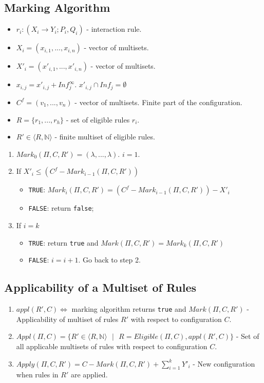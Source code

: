 \documentclass{article}
\newcommand{\s}{\text{ }}
\begin{document}
\subsection{Marking Algorithm}

\begin{itemize}
   \item $r_i: (X_i \rightarrow Y_i; P_i, Q_i)$ - interaction rule.
   \item $X_i = (x_{i,1},...,x_{i,n})$ - vector of multisets.
   \item $X'_i = (x'_{i,1},...,x'_{i,n})$ - vector of multisets.
   \item $x_{i,j} = x'_{i,j} + Inf_{j}^{\infty}$. $x'_{i,j} \cap Inf_j = \emptyset$
   \item $C^f = (v_1,...,v_n)$ - vector of multisets. Finite part of the configuration.
   \item $R = \{r_1,...,r_h\}$ - set of eligible rules $r_i$.
   \item $R' \in \langle R, \mathbb{N} \rangle$ - finite multiset of eligible rules.
\end{itemize}

\begin{enumerate}
   \item $Mark_0(\Pi, C, R') = (\lambda,...,\lambda)$. $i = 1$.
   \item If $X'_i \leq (C^f - Mark_{i-1}(\Pi, C, R'))$
         \begin{itemize}
         \item \texttt{TRUE}: $Mark_i(\Pi, C, R') = (C^f - Mark_{i-1}(\Pi, C, R')) - X'_i$
         \item \texttt{FALSE}: return \texttt{false};
         \end{itemize}
   \item If $i=k$
         \begin{itemize}
         \item \texttt{TRUE}: return \texttt{true} and $Mark(\Pi, C, R') = Mark_k(\Pi, C, R')$
         \item \texttt{FALSE}: $i = i + 1$. Go back to step 2.
         \end{itemize}
\end{enumerate}

\subsection{Applicability of a Multiset of Rules}

\begin{enumerate}
   \item $appl(R',C) \Leftrightarrow $ marking algorithm returns \texttt{true} and $Mark(\Pi,C,R')$ 
         - Applicability of multiset of rules $R'$ with respect to configuration $C$.
   \item $Appl(\Pi, C) = \{R' \in \langle R, \mathbb{N} \rangle \s | \s R = Eligible(\Pi,C), 
         appl(R',C) \}$ - Set of all applicable multisets of rules with respect to configuration $C$.
   \item $Apply(\Pi, C,R') = C - Mark(\Pi, C, R') + \sum_{i=1}^{k} Y'_i $ - New configuration when
         rules in $R'$ are applied.
\end{enumerate}
\end{document}
